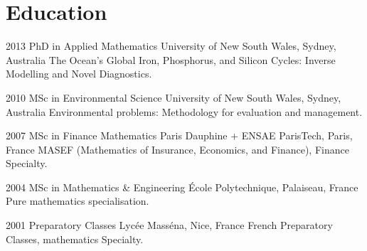 
\section{Education}
\begin{entrylist}
  \entry
    {2013}
    {PhD in Applied Mathematics}
    {University of New South Wales, Sydney, Australia}
    {The Ocean's Global Iron, Phosphorus, and Silicon Cycles: Inverse Modelling and Novel Diagnostics.}

  \entry
    {2010}
    {MSc in Environmental Science}
    {University of New South Wales, Sydney, Australia}
    {Environmental problems: Methodology for evaluation and management.}

  \entry
    {2007}
    {MSc in Finance Mathematics}
    {Paris Dauphine + ENSAE ParisTech, Paris, France}
    {MASEF (Mathematics of Insurance, Economics, and Finance), Finance Specialty.}

  \entry
    {2004}
    {MSc in Mathematics \& Engineering}
    {\'{E}cole Polytechnique, Palaiseau, France}
    {Pure mathematics specialisation.}

  \entry
    {2001}
    {Preparatory Classes}
    {Lyc\'{e}e Mass\'{e}na, Nice, France}
    {French Preparatory Classes, mathematics Specialty.}
\end{entrylist}





